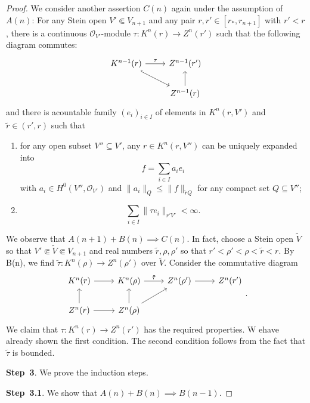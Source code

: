 \begin{proof}
    We consider another assertion $C(n)$ again under the assumption of $A(n)$: For any Stein open $V'\Subset V_{n+1}$ and any pair $r,r'\in [r_*,r_{n+1}]$ with $r'<r$, there is a continuous $\mathcal{O}_{V'}$-module $\tau:K^n(r)\rightarrow Z^n(r')$ such that
    the following diagram commutes:
    \[
        \begin{tikzcd}
            K^{n-1}(r) \arrow[rd, hook] \arrow[r, "\tau"] & Z^{n-1}(r')          \\
                                                          & Z^{n-1}(r) \arrow[u]
            \end{tikzcd}
    \]  
    and there is acountable family $(e_i)_{i\in I}$ of elements in $K^n(r,V')$ and $\tilde{r}\in (r',r)$ such that
    \begin{enumerate}
        \item for any open subset $V''\subseteq V'$, any $r\in K^n(r,V'')$ can be uniquely expanded into
        \[
            f=\sum_{i\in I}a_i e_i  
        \]
        with $a_i\in H^0(V'',\mathcal{O}_{V'})$ and $\|a_i\|_Q\leq \|f\|_{\tilde{r}Q}$ for any compact set $Q\subseteq V''$;
        \item
        \[
            \sum_{i\in I}\|\tau e_i\|_{r'V'}<\infty.
        \]
    \end{enumerate}

    We observe that $A(n+1)+B(n)\implies C(n)$. In fact, choose a Stein open $\tilde{V}$ so that $V'\Subset 
\tilde{V}\Subset V_{n+1}$ and real numbers $\tilde{r},\rho,\rho'$ so that $r'<\rho'<\rho<\tilde{r}<r$. By B(n), we find $\tilde{\tau}:K^n(\rho)\rightarrow Z^n(\rho')$ over $\tilde{V}$. Consider the commutative diagram
\[
    \begin{tikzcd}
        K^n(r) \arrow[r]           & K^n(\rho) \arrow[r, "\tilde{\tau}"] & Z^n(\rho') \arrow[r] & Z^n(r') \\
        Z^n(r) \arrow[u] \arrow[r] & Z^n(\rho) \arrow[u] \arrow[ru]      &                      &        
        \end{tikzcd}.  
\]
We claim that $\tau:K^n(r)\rightarrow Z^n(r')$ has the required properties. W ehave already shown the first condition. The second condition follows from the fact that $\tilde{\tau}$ is bounded.

\textbf{Step~3}. We prove the induction steps.

\textbf{Step~3.1}. We show that $A(n)+B(n)\implies B(n-1)$. 


\end{proof}
